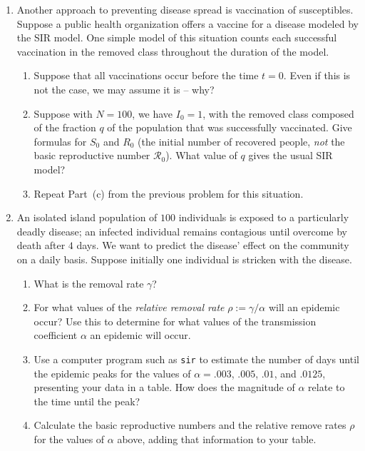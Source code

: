 \documentclass[12pt]{article}
\begin{document}
\begin{enumerate}
\item Another approach to preventing disease spread is vaccination of
  susceptibles. Suppose a public health organization offers a vaccine
  for a disease modeled by the SIR model. One simple model of this
  situation counts each successful vaccination in the removed class
  throughout the duration of the model. 
  \begin{enumerate}
  \item Suppose that all vaccinations occur before the time $t=0$. Even if
    this is not the case, we may assume it is -- why?
  \item Suppose with $N=100$, we have $I_0=1$, with the removed class
    composed of the fraction $q$ of the population that was
    successfully vaccinated. Give formulas for $S_0$ and $R_0$ (the
    initial number of recovered people, \emph{not} the basic reproductive
    number $\mathcal{R}_0$). What value of $q$ gives the usual SIR
    model?
  \item Repeat Part~(c) from the previous problem for this situation.
  \end{enumerate}



\item An isolated island population of $100$ individuals is exposed to
  a particularly deadly disease; an infected individual remains
  contagious until overcome by death after $4$ days. We want to
  predict the disease' effect on the community on a daily
  basis. Suppose initially one individual is stricken with the disease. 
  \begin{enumerate}
    \item What is the removal rate $\gamma$? 
    \item For what values of the \emph{relative removal rate}
      $\rho:=\gamma/\alpha$ will an epidemic occur? Use this to
      determine for what values of the transmission coefficient
      $\alpha$ an epidemic will occur.
    \item Use a computer program such as {\tt sir} to estimate the
      number of days until the epidemic peaks for the values of
      $\alpha=.003$, $.005$, $.01$, and $.0125$, presenting your data
      in a table. How does the magnitude of $\alpha$ relate to the
      time until the peak?
    \item Calculate the basic reproductive numbers and the relative
      remove rates $\rho$ for the values of $\alpha$ above, adding
      that information to your table.
  \end{enumerate}




\end{enumerate}
\end{document}
